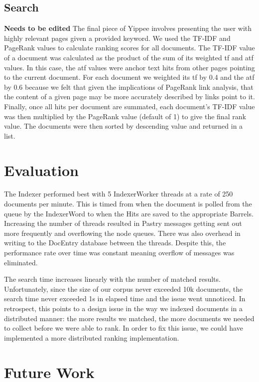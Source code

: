 \documentclass[11pt, letterpaper, oneside, twocolumn]{article}
\begin{document}
\subsection{Search}
\textbf{Needs to be edited}
The final piece of Yippee involves presenting the user with highly relevant pages given a provided keyword.
We used the TF-IDF and PageRank values to calculate ranking scores for all documents. 
The TF-IDF value of a document was calculated as the product of the sum of its weighted tf and atf values. 
In this case, the atf values were anchor text hits from other pages pointing to the current document. For each document we weighted its tf by 0.4 and the atf by 0.6 because we felt that given the implications of PageRank link analysis, that the content of a given page may be more accurately described by links point to it. 
Finally, once all hits per document are summated, each document's TF-IDF value was then multiplied by the PageRank value (default of 1) to give the final rank value. 
The documents were then sorted by descending value and returned in a list. 

\section{Evaluation}
\label{sec:evaluation}

The Indexer performed best with 5 IndexerWorker threads at a rate of 250 documents per minute. 
This is timed from when the document is polled from the queue by the IndexerWord to when the Hits are saved to the appropriate Barrels. 
Increasing the number of threads resulted in Pastry messages getting sent out more frequently and overflowing the node queues. 
There was also overhead in writing to the DocEntry database between the threads. 
Despite this, the performance rate over time was constant meaning overflow of messages was eliminated. 

The search time increases linearly with the number of matched results. 
Unfortunately, since the size of our corpus never exceeded 10k documents, the search time never exceeded 1s in elapsed time and the issue went unnoticed. 
In retrospect, this points to a design issue in the way we indexed documents in a distributed manner: the more results we matched, the more documents we needed to collect before we were able to rank. 
In order to fix this issue, we could have implemented a more distributed ranking implementation.

\section{Future Work}
\label{sec:future}
\end{document}
